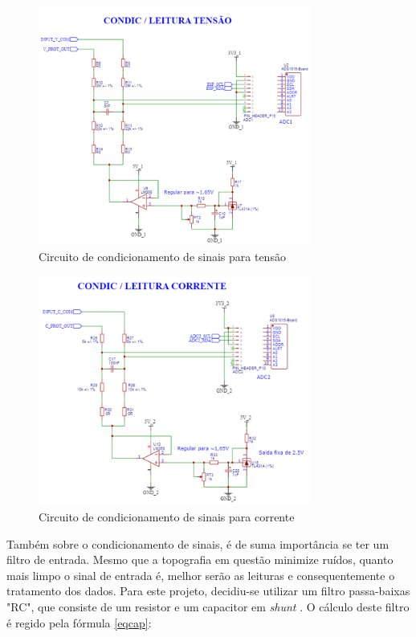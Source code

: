 \begin{figure}[htb!]
    \caption{Circuito de condicionamento de sinais para tensão}
    \label{fig:circ-cond-t}
    \includegraphics[width=0.8\textwidth]{figuras/circ-cond-t.png}
    \fonte{}
\end{figure}

\begin{figure}[htb!]
    \caption{Circuito de condicionamento de sinais para corrente}
    \label{fig:circ-cond-c}
    \includegraphics[width=0.8\textwidth]{figuras/circ-cond-c.png}
    \fonte{}
\end{figure}

Também sobre o condicionamento de sinais, é de suma importância se ter um filtro de entrada. Mesmo que a topografia em questão minimize ruídos, quanto mais limpo o sinal de entrada é, melhor serão as leituras e consequentemente o tratamento dos dados. Para este projeto, decidiu-se utilizar um filtro passa-baixas "RC", que consiste de um resistor e um capacitor em \textit{shunt} \cite{filtros}. O cálculo deste filtro é regido pela fórmula \autoref{eqcap}:

